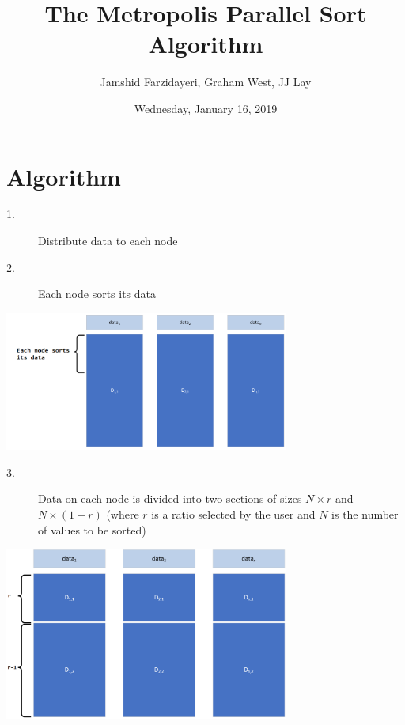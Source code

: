 \documentclass[letter]{article}
\begin{document}
\title{The Metropolis Parallel Sort Algorithm}
\author{Jamshid  Farzidayeri, Graham West, JJ Lay}
\date{Wednesday, January 16, 2019}

\maketitle

% 


\section{Algorithm}

\begin{description}
\item[1.]{Distribute data to each node}
\item[2.]{Each node sorts its data}
\end{description}
\includegraphics[width=0.7\textwidth]{images/Capture0.PNG}

\begin{description}
\item[3.]{Data on each node is divided into two sections of sizes $N \times r$ and $N \times (1-r)$ (where $r$ is a ratio selected by the user and $N$ is the number of values to be sorted)}
\end{description}
\includegraphics[width=0.7\textwidth]{images/Capture1.PNG}
\end{document}

